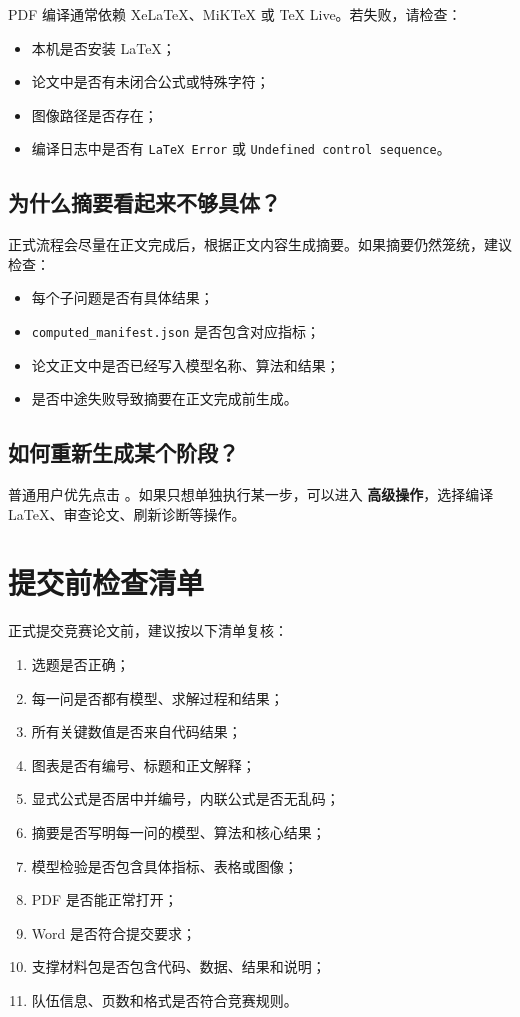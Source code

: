 \documentclass[UTF8,a4paper,12pt]{ctexart}
\newcommand{\button}[1]{\fbox{\textsf{#1}}}
\newcommand{\menu}[1]{\textbf{#1}}
\begin{document}
PDF 编译通常依赖 XeLaTeX、MiKTeX 或 TeX Live。若失败，请检查：

\begin{itemize}
  \item 本机是否安装 LaTeX；
  \item 论文中是否有未闭合公式或特殊字符；
  \item 图像路径是否存在；
  \item 编译日志中是否有 \texttt{LaTeX Error} 或 \texttt{Undefined control sequence}。
\end{itemize}

\subsection{为什么摘要看起来不够具体？}

正式流程会尽量在正文完成后，根据正文内容生成摘要。如果摘要仍然笼统，建议检查：

\begin{itemize}
  \item 每个子问题是否有具体结果；
  \item \texttt{computed\_manifest.json} 是否包含对应指标；
  \item 论文正文中是否已经写入模型名称、算法和结果；
  \item 是否中途失败导致摘要在正文完成前生成。
\end{itemize}

\subsection{如何重新生成某个阶段？}

普通用户优先点击 \button{继续}。如果只想单独执行某一步，可以进入 \menu{高级操作}，选择编译 LaTeX、审查论文、刷新诊断等操作。

\section{提交前检查清单}

正式提交竞赛论文前，建议按以下清单复核：

\begin{enumerate}
  \item 选题是否正确；
  \item 每一问是否都有模型、求解过程和结果；
  \item 所有关键数值是否来自代码结果；
  \item 图表是否有编号、标题和正文解释；
  \item 显式公式是否居中并编号，内联公式是否无乱码；
  \item 摘要是否写明每一问的模型、算法和核心结果；
  \item 模型检验是否包含具体指标、表格或图像；
  \item PDF 是否能正常打开；
  \item Word 是否符合提交要求；
  \item 支撑材料包是否包含代码、数据、结果和说明；
  \item 队伍信息、页数和格式是否符合竞赛规则。
\end{enumerate}
\end{document}
